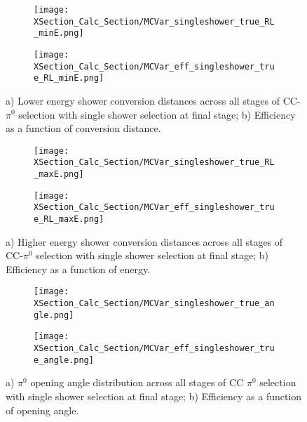 \begin{figure}[h!]
  \begin{subfigure}[t]{0.39\textwidth}
\texttt{[image: XSection\_Calc\_Section/MCVar\_singleshower\_true\_RL\_minE.png]}
  \caption{ }
  \end{subfigure} 
  \hspace{15mm}
  \begin{subfigure}[t]{0.39\textwidth}
\texttt{[image: XSection\_Calc\_Section/MCVar\_eff\_singleshower\_true\_RL\_minE.png]}
  \caption{ }
  \end{subfigure} 
\caption{a) Lower energy shower conversion distances across all stages of CC-$\pi^0$ selection with single shower selection at final stage; b) Efficiency as a function of conversion distance. }
\label{fig:pi0_effs_11}
\end{figure}

\begin{figure}[h!]
  \begin{subfigure}[t]{0.39\textwidth}
\texttt{[image: XSection\_Calc\_Section/MCVar\_singleshower\_true\_RL\_maxE.png]}
  \caption{ }
  \end{subfigure} 
  \hspace{15mm}
  \begin{subfigure}[t]{0.39\textwidth}
\texttt{[image: XSection\_Calc\_Section/MCVar\_eff\_singleshower\_true\_RL\_maxE.png]}
  \caption{ }
  \end{subfigure} 
\caption{a) Higher energy shower conversion distances across all stages of CC-$\pi^0$ selection with single shower selection at final stage; b) Efficiency as a function of energy. }
\label{fig:pi0_effs_12}
\end{figure}


\begin{figure}[h!]
  \begin{subfigure}[t]{0.39\textwidth}
\texttt{[image: XSection\_Calc\_Section/MCVar\_singleshower\_true\_angle.png]}
  \caption{ }
  \end{subfigure} 
  \hspace{15mm}
  \begin{subfigure}[t]{0.39\textwidth}
\texttt{[image: XSection\_Calc\_Section/MCVar\_eff\_singleshower\_true\_angle.png]}
  \caption{ }
  \end{subfigure} 
\caption{a) $\pi^0$ opening angle distribution across all stages of CC $\pi^0$ selection with single shower selection at final stage; b) Efficiency as a function of opening angle. }
\label{fig:pi0_effs_13}
\end{figure}


